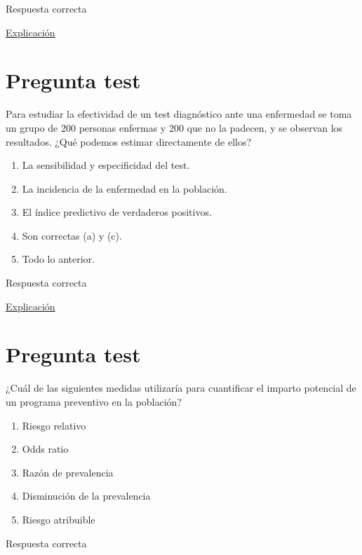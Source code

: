 \documentclass[
]{book}
\providecommand{\tightlist}{%
  \setlength{\itemsep}{0pt}\setlength{\parskip}{0pt}}
\begin{document}
Respuesta correcta

\href{https://es.wikipedia.org/wiki/Riesgo_atribuible}{Explicación}

\hypertarget{pregunta-test-165}{%
\section{Pregunta test}\label{pregunta-test-165}}

Para estudiar la efectividad de un test diagnóstico ante una enfermedad se toma un grupo de 200 personas enfermas y 200 que no la padecen, y se observan los resultados. ¿Qué podemos estimar directamente de ellos?

\begin{enumerate}
\def\labelenumi{\alph{enumi})}
\tightlist
\item
  La sensibilidad y especificidad del test.
\item
  La incidencia de la enfermedad en la población.
\item
  El índice predictivo de verdaderos positivos.
\item
  Son correctas (a) y (c).
\item
  Todo lo anterior.
\end{enumerate}

Respuesta correcta

\href{https://1fjmanzano.github.io/bioestadistica/relaci\%C3\%B3n-entre-variables-cualitativas.html\#diagno\%CC\%81stico-cli\%CC\%81nico}{Explicación}

\hypertarget{pregunta-test-166}{%
\section{Pregunta test}\label{pregunta-test-166}}

¿Cuál de las siguientes medidas utilizaría para cuantificar el imparto potencial de un programa preventivo en la población?

\begin{enumerate}
\def\labelenumi{\alph{enumi})}
\tightlist
\item
  Riesgo relativo
\item
  Odds ratio
\item
  Razón de prevalencia
\item
  Disminución de la prevalencia
\item
  Riesgo atribuible
\end{enumerate}

Respuesta correcta
\end{document}

